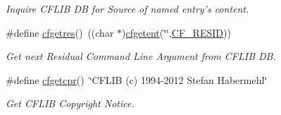 \begin{DoxyCompactItemize}
\begin{DoxyCompactList}\small\item\em Inquire C\-F\-L\-I\-B D\-B for Source of named entry's content. \end{DoxyCompactList}\item 
\#define \hyperlink{group__retrieval_ga6ef6076e946383ab198ee26b9aa5603a}{cfgetres}()~((char $\ast$)\hyperlink{group__retrieval_gac13ba743ed26e6c05df14817ad9df3da}{cfgetent}(\char`\"{}\char`\"{},\hyperlink{group__special__options__mask_ga5415b257c706aae33d91d3947a3429c0}{C\-F\-\_\-\-R\-E\-S\-I\-D}))
\begin{DoxyCompactList}\small\item\em Get next Residual Command Line Argument from C\-F\-L\-I\-B D\-B. \end{DoxyCompactList}\item 
\#define \hyperlink{group__retrieval_ga9999522b2acf8760f420d2567e7f7c50}{cfgetcpr}()~\char`\"{}C\-F\-L\-I\-B (c) 1994-\/2012 Stefan Habermehl\char`\"{}
\begin{DoxyCompactList}\small\item\em Get C\-F\-L\-I\-B Copyright Notice. \end{DoxyCompactList}\end{DoxyCompactItemize}
